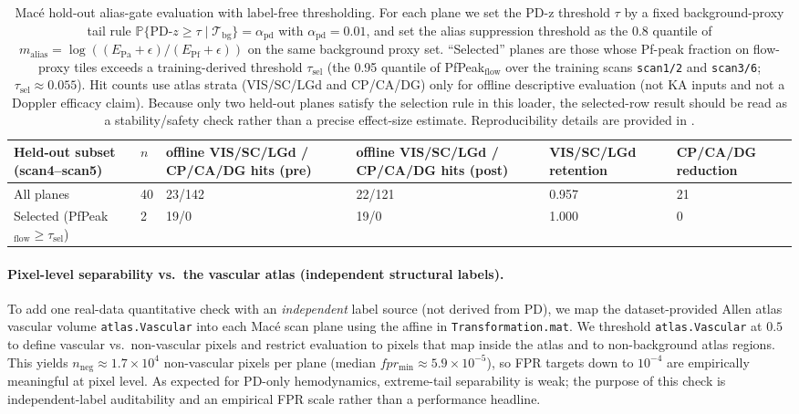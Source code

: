 \begin{table}[t]
\centering
\small
\begingroup
\setlength{\tabcolsep}{3pt}
\begin{tabular}{P{3.6cm} C{0.7cm} C{2.4cm} C{2.4cm} C{1.5cm} C{1.5cm}}
\hline
Held-out subset (scan4--scan5) & $n$ & offline VIS/\allowbreak SC/\allowbreak LGd / CP/\allowbreak CA/\allowbreak DG hits (pre) & offline VIS/\allowbreak SC/\allowbreak LGd / CP/\allowbreak CA/\allowbreak DG hits (post) & VIS/\allowbreak SC/\allowbreak LGd retention & CP/\allowbreak CA/\allowbreak DG reduction \\
\hline
All planes & 40 & 23/142 & 22/121 & 0.957 & 21 \\
Selected (PfPeak$_{\mathrm{flow}}\ge\tau_{\mathrm{sel}}$) & 2 & 19/0 & 19/0 & 1.000 & 0 \\
\hline
\end{tabular}
\endgroup
\caption{Mac{\'e} hold-out alias-gate evaluation with label-free thresholding. For each plane we set the PD-z threshold $\tau$ by a fixed background-proxy tail rule $\mathbb{P}\{\mathrm{PD}\text{-}z\ge\tau\mid\mathcal{T}_{\mathrm{bg}}\}=\alpha_{\mathrm{pd}}$ with $\alpha_{\mathrm{pd}}=0.01$, and set the alias suppression threshold as the $0.8$ quantile of $m_{\mathrm{alias}}=\log((E_{\mathrm{Pa}}+\epsilon)/(E_{\mathrm{Pf}}+\epsilon))$ on the same background proxy set. ``Selected'' planes are those whose Pf-peak fraction on flow-proxy tiles exceeds a training-derived threshold $\tau_{\mathrm{sel}}$ (the 0.95 quantile of PfPeak$_{\mathrm{flow}}$ over the training scans \texttt{scan1/2} and \texttt{scan3/6}; $\tau_{\mathrm{sel}}\approx 0.055$). Hit counts use atlas strata (VIS/SC/LGd and CP/CA/DG) only for offline descriptive evaluation (not KA inputs and not a Doppler efficacy claim). Because only two held-out planes satisfy the selection rule in this loader, the selected-row result should be read as a stability/safety check rather than a precise effect-size estimate. Reproducibility details are provided in .}
\label{tab:mace_holdout_alias_gate}
\end{table}

\paragraph{Pixel-level separability vs.\ the vascular atlas (independent structural labels).}
To add one real-data quantitative check with an \emph{independent} label source (not derived from PD), we map the dataset-provided Allen atlas vascular volume \texttt{atlas.Vascular} into each Mac{\'e} scan plane using the affine in \texttt{Transformation.mat}. We threshold \texttt{atlas.Vascular} at $0.5$ to define vascular vs.\ non-vascular pixels and restrict evaluation to pixels that map inside the atlas and to non-background atlas regions. This yields $n_{\mathrm{neg}}\approx 1.7\times 10^4$ non-vascular pixels per plane (median $fpr_{\min}\approx 5.9\times 10^{-5}$), so FPR targets down to $10^{-4}$ are empirically meaningful at pixel level.
As expected for PD-only hemodynamics, extreme-tail separability is weak; the purpose of this check is independent-label auditability and an empirical FPR scale rather than a performance headline.


